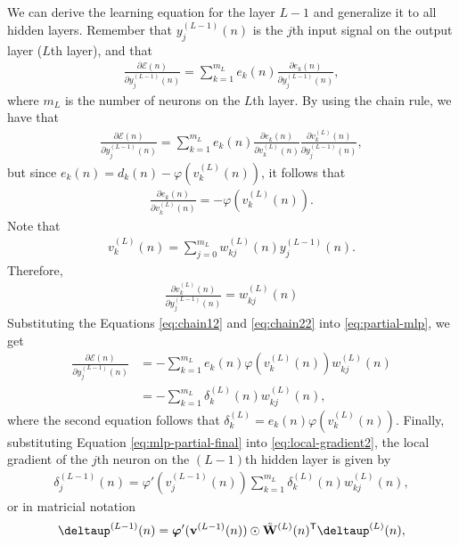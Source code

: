 \documentclass[12pt,a4paper]{article}
\newcommand{\trans}{\mathsf{T}}
\begin{document}
We can derive the learning equation for the layer \(L-1\) and generalize it to all hidden layers. Remember that \(y_{j}^{(L-1)}(n)\) is the \(j\)th input signal on the output layer (\(L\)th layer), and that
\begin{align}
    \frac{\partial \mathscr{E}(n)}{\partial y_{j}^{(L-1)}(n)} = \sum_{k=1}^{m_L} e_k(n) \frac{\partial e_k(n)}{\partial y_{j}^{(L-1)}(n)},
\end{align}
where \(m_L\) is the number of neurons on the \(L\)th layer. By using the chain rule, we have that
\begin{align}
    \frac{\partial \mathscr{E}(n)}{\partial y_{j}^{(L-1)}(n)} = \sum_{k=1}^{m_L} e_k(n) \frac{\partial e_k(n)}{\partial v_{k}^{(L)}(n)} \frac{\partial v_{k}^{(L)}(n)}{\partial y_{j}^{(L-1)}(n)},
    \label{eq:partial-mlp}
\end{align}
but since \(e_k(n) = d_k(n) - \varphi(v_k^{(L)}(n))\), it follows that
\begin{align}
    \frac{\partial e_k(n)}{\partial v_{k}^{(L)}(n)} = - \varphi(v_k^{(L)}(n)).
    \label{eq:chain12}
\end{align}
Note that
\begin{align}
    v_{k}^{(L)}(n) = \sum_{j=0}^{m_L} w_{kj}^{(L)}(n) y_{j}^{(L-1)}(n).
\end{align}
Therefore,
\begin{align}
    \frac{\partial v_{k}^{(L)}(n)}{\partial y_{j}^{(L-1)}(n)} = w_{kj}^{(L)}(n)
    \label{eq:chain22}
\end{align}
Substituting the Equations \eqref{eq:chain12} and \eqref{eq:chain22} into \eqref{eq:partial-mlp}, we get
\begin{align}
    \frac{\partial \mathscr{E}(n)}{\partial y_{j}^{(L-1)}(n)}  & = - \sum_{k=1}^{m_L} e_k(n) \varphi(v_k^{(L)}(n)) w_{kj}^{(L)}(n) \nonumber \\
    & = - \sum_{k=1}^{m_L} \delta_k^{(L)} (n) w_{kj}^{(L)}(n),
    \label{eq:mlp-partial-final}
\end{align}
where the second equation follows that \(\delta_k^{(L)} = e_k(n) \varphi(v_k^{(L)}(n))\). Finally, substituting Equation \eqref{eq:mlp-partial-final} into \eqref{eq:local-gradient2}, the local gradient of the \(j\)th neuron on the \((L-1)\)th hidden layer is given by
\begin{align}
    \delta_j^{(L-1)} (n) = \varphi'(v_j^{(L-1)}(n)) \sum_{k=1}^{m_L} \delta_k^{(L)} (n) w_{kj}^{(L)}(n),
\end{align}
or in matricial notation
\begin{align}
    \boldsymbol{\deltaup}^{(L-1)} (n) = \boldsymbol{\varphi}'(\mathbf{v}^{(L-1)}(n)) \odot \tilde{\mathbf{W}}^{(L)}(n)^\trans \boldsymbol{\deltaup}^{(L)} (n),
    \label{eq:uptade-layer-L-1}
\end{align}
\end{document}
